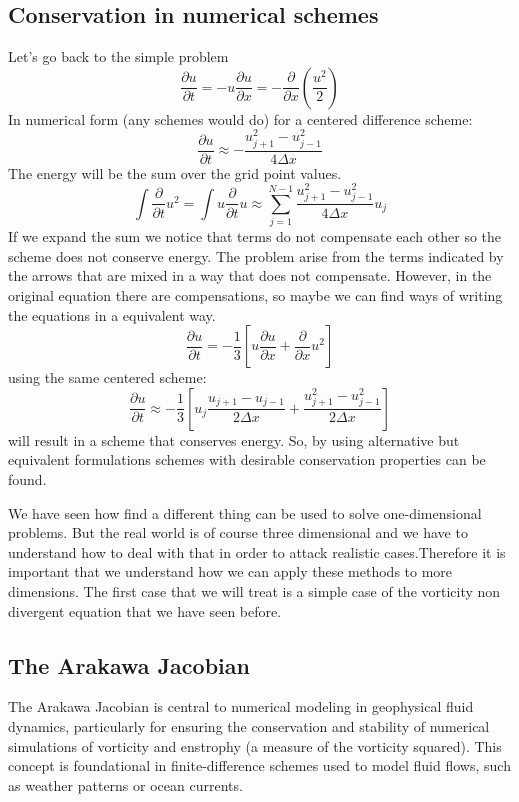 \subsection{Conservation in numerical schemes}
Let's go back to the simple problem 
\begin{equation}
    \frac{\partial u}{\partial t}=-u\frac{\partial u}{\partial x}=-\frac{\partial}{\partial x}\left(\frac{u^2}{2}\right)
\end{equation}
In numerical form (any schemes would do) for a centered difference scheme:
\begin{equation}
    \frac{\partial u}{\partial t}\approx -\frac{u^2_{j+1}-u^2_{j-1}}{4\Delta x}
\end{equation}
The energy will be the sum over the grid point values. 
\begin{equation}
    \int\frac{\partial}{\partial t}u^2=\int u\frac{\partial}{\partial t}u\approx\displaystyle\sum_{j=1}^{N-1}\frac{u^2_{j+1}-u^2_{j-1}}{4\Delta x}u_j
\end{equation}
If we expand the sum we notice that terms do not compensate each other so the scheme does not conserve energy. The problem arise from the terms indicated by the arrows that are mixed in a way that does not compensate. However, in the original equation there are compensations, so maybe we can find ways of writing the equations in a equivalent way. 
$$
    \frac{\partial u}{\partial t}=-\frac{1}{3}\left[u\frac{\partial u}{\partial x}+\frac{\partial}{\partial x}u^2\right]
$$
using the same centered scheme:
$$\frac{\partial u}{\partial t}\approx -\frac{1}{3}\left[u_j\frac{u_{j+1}-u_{j-1}}{2\Delta x}+\frac{u^2_{j+1}-u^2_{j-1}}{2\Delta x}\right]
$$
will result in a scheme that conserves energy. So, by using alternative but equivalent formulations schemes with desirable conservation properties can be found. 

We have seen how find a different thing can be used to solve one-dimensional problems. But the real world is of course three dimensional and we have to understand how to deal with that in order to attack realistic cases.Therefore it is important that we understand how we can apply these methods to more dimensions. The first case that we will treat is a simple case of the vorticity non divergent equation that we have seen before.
\subsection{The Arakawa Jacobian}
The Arakawa Jacobian is central to numerical modeling in geophysical fluid dynamics, particularly for ensuring the conservation and stability of numerical simulations of vorticity and enstrophy (a measure of the vorticity squared). This concept is foundational in finite-difference schemes used to model fluid flows, such as weather patterns or ocean currents.


